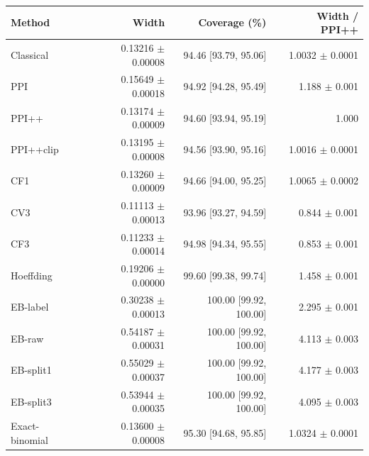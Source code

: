 \small
\begin{tabular}{lrrr}
\toprule
Method & Width & Coverage (\%) & Width / PPI++ \\
\midrule
Classical & 0.13216 $\pm$ 0.00008 & 94.46 [93.79, 95.06] & 1.0032 $\pm$ 0.0001 \\
PPI & 0.15649 $\pm$ 0.00018 & 94.92 [94.28, 95.49] & 1.188 $\pm$ 0.001 \\
PPI++ & 0.13174 $\pm$ 0.00009 & 94.60 [93.94, 95.19] & 1.000 \\
PPI++clip & 0.13195 $\pm$ 0.00008 & 94.56 [93.90, 95.16] & 1.0016 $\pm$ 0.0001 \\
CF1 & 0.13260 $\pm$ 0.00009 & 94.66 [94.00, 95.25] & 1.0065 $\pm$ 0.0002 \\
CV3 & 0.11113 $\pm$ 0.00013 & 93.96 [93.27, 94.59] & 0.844 $\pm$ 0.001 \\
CF3 & 0.11233 $\pm$ 0.00014 & 94.98 [94.34, 95.55] & 0.853 $\pm$ 0.001 \\
Hoeffding & 0.19206 $\pm$ 0.00000 & 99.60 [99.38, 99.74] & 1.458 $\pm$ 0.001 \\
EB-label & 0.30238 $\pm$ 0.00013 & 100.00 [99.92, 100.00] & 2.295 $\pm$ 0.001 \\
EB-raw & 0.54187 $\pm$ 0.00031 & 100.00 [99.92, 100.00] & 4.113 $\pm$ 0.003 \\
EB-split1 & 0.55029 $\pm$ 0.00037 & 100.00 [99.92, 100.00] & 4.177 $\pm$ 0.003 \\
EB-split3 & 0.53944 $\pm$ 0.00035 & 100.00 [99.92, 100.00] & 4.095 $\pm$ 0.003 \\
Exact-binomial & 0.13600 $\pm$ 0.00008 & 95.30 [94.68, 95.85] & 1.0324 $\pm$ 0.0001 \\
\bottomrule
\end{tabular}
